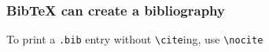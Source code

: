\documentclass{beamer}
\begin{document}
\begin{frame}[fragile]
\frametitle{BibTeX can create a bibliography}

To print a \verb~.bib~ entry without \verb~\cite~ing, use \verb~\nocite~
\nocite{Manual, Metropolis, Themes}

\vfill

 


\vfill 

\end{frame}
\end{document}
